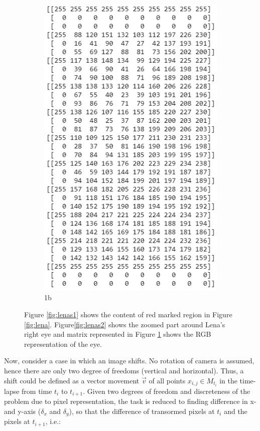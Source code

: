 \documentclass[pdftex,12pt,a4paper]{report}
\begin{document}
\begin{figure}[h]
\begin{subfigure}{.5\textwidth}
  \includegraphics[width=.8\linewidth]{lenna_rbg}
  \caption{1b}
  \label{fig:lenas3}
\end{subfigure}
\caption{Figure \ref{fig:lenas1} shows the content of red marked region in Figure \ref{fig:lena}. Figure\ref{fig:lenas2} shows the zoomed part around Lena's right eye and matrix represented in Figure \ref{fig:lenas3} shows the RGB representation of the eye.}
\label{fig:lenas}
\end{figure}


Now, consider a case in which an image shifts. No rotation of camera is assumed, hence there are only two degree of freedoms (vertical and horizontal). Thus, a shift could be defined as a vector movement $\vec{v}$ of all points $x_{i,j} \in M_{t_i}$ in the time-lapse from time $t_i$ to $t_{i+1}$. Given two degrees of freedom and discreteness of the problem due to pixel representation, the task is reduced to finding difference in x- and y-axis ($\delta_x$ and $\delta_y$), so that the difference of transormed pixels at $t_i$ and the pixels at $t_{i+1}$, i.e.:
\end{document}
